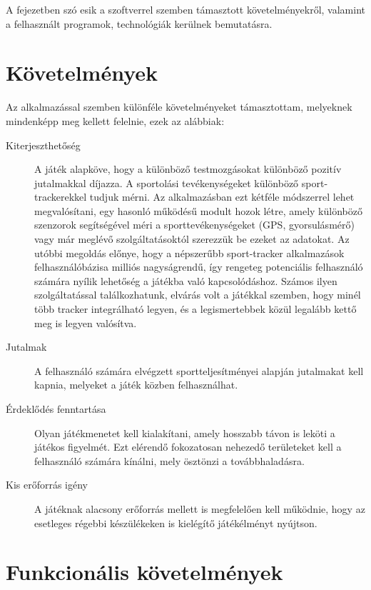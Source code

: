 
A fejezetben szó esik a szoftverrel szemben támasztott követelményekről, valamint a felhasznált programok, technológiák kerülnek bemutatásra. 

\section{Követelmények}
\label{kovetelmenyek}

Az alkalmazással szemben különféle követelményeket támasztottam, melyeknek mindenképp meg kellett felelnie, ezek az alábbiak: 

\begin{description}
	\item [Kiterjeszthetőség] 
    A játék alapköve, hogy a különböző testmozgásokat különböző pozitív jutalmakkal díjazza. 
	A sportolási tevékenységeket különböző sport-trackerekkel tudjuk mérni. 
	Az alkalmazásban ezt kétféle módszerrel lehet megvalósítani, egy hasonló működésű modult hozok létre, amely különböző szenzorok segítségével méri a sporttevékenységeket (GPS, gyorsulásmérő) vagy már meglévő szolgáltatásoktól szerezzük be ezeket az adatokat. 
	Az utóbbi megoldás előnye, hogy a népszerűbb sport-tracker alkalmazások felhasználóbázisa milliós nagyságrendű, így rengeteg potenciális felhasználó számára nyílik lehetőség a játékba való kapcsolódáshoz. 
	Számos ilyen szolgáltatással találkozhatunk, elvárás volt a játékkal szemben, hogy minél több tracker integrálható legyen, és a legismertebbek közül legalább kettő meg is legyen valósítva.	
	\item [Jutalmak] 
	A felhasználó számára elvégzett sportteljesítményei alapján jutalmakat kell kapnia, melyeket a játék közben felhasználhat. 
	\item [Érdeklődés fenntartása] 
	Olyan játékmenetet kell kialakítani, amely hosszabb távon is leköti a játékos figyelmét. 
	Ezt elérendő fokozatosan nehezedő területeket kell a felhasználó számára kínálni, mely ösztönzi a továbbhaladásra.
	\item [Kis erőforrás igény] 
	A játéknak alacsony erőforrás mellett is megfelelően kell működnie, hogy az esetleges régebbi készülékeken is kielégítő játékélményt nyújtson. 
\end{description}


\section*{Funkcionális követelmények}
\label{funkckovetelmenyeks}

